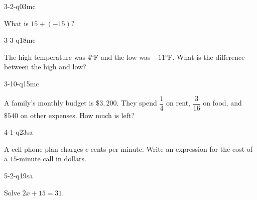 \begin{practiceQuestion}{3-2-q03}{mc}
\begin{questionText}
What is $15 + (-15)$?
\end{questionText}
\end{practiceQuestion}

\begin{practiceQuestion}{3-3-q18}{mc}
\begin{questionText}
The high temperature was $4°$F and the low was $-11°$F. What is the difference between the high and low?
\end{questionText}
\end{practiceQuestion}

\begin{practiceQuestion}{3-10-q15}{mc}
\begin{questionText}
A family's monthly budget is $\$3{,}200$. They spend $\dfrac{1}{4}$ on rent, $\dfrac{3}{16}$ on food, and $\$540$ on other expenses. How much is left?
\end{questionText}
\end{practiceQuestion}

\begin{practiceQuestion}{4-1-q23}{sa}
\begin{questionText}
A cell phone plan charges $c$ cents per minute. Write an expression for the cost of a $15$-minute call in dollars.
\end{questionText}
\end{practiceQuestion}

\begin{practiceQuestion}{5-2-q19}{sa}
\begin{questionText}
Solve $2x + 15 = 31$.
\end{questionText}
\end{practiceQuestion}

